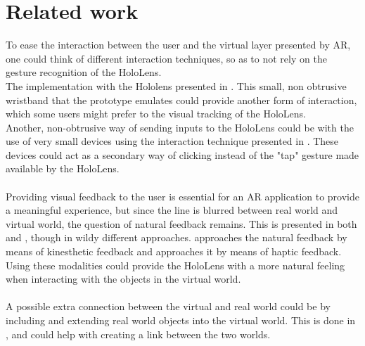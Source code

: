 
\section{Related work}
To ease the interaction between the user and the virtual layer presented by AR, one could think of different interaction techniques, so as to not rely on the gesture recognition of the HoloLens.\\
The implementation with the Hololens presented in \cite{watchsense}. This small, non obtrusive wristband that the prototype emulates could provide another form of interaction, which some users might prefer to the visual tracking of the HoloLens.\\
Another, non-obtrusive way of sending inputs to the HoloLens could be with the use of very small devices using the interaction technique presented in \cite{back}. These devices could act as a secondary way of clicking instead of the "tap" gesture made available by the HoloLens.\\
\\
Providing visual feedback to the user is essential for an AR application to  provide a meaningful experience, but since the line is blurred between real world and virtual world, the question of natural feedback remains. This is presented in both \cite{strøm} and \cite{finger}, though in wildy different approaches. \cite{strøm} approaches the natural feedback by means of kinesthetic feedback and \cite{finger} approaches it by means of haptic feedback. Using these modalities could provide the HoloLens with a more natural feeling when interacting with the objects in the virtual world.\\
\\
A possible extra connection between the virtual and real world could be by including and extending real world objects into the virtual world. This is done in \cite{multifi}, and could help with creating a link between the two worlds. 